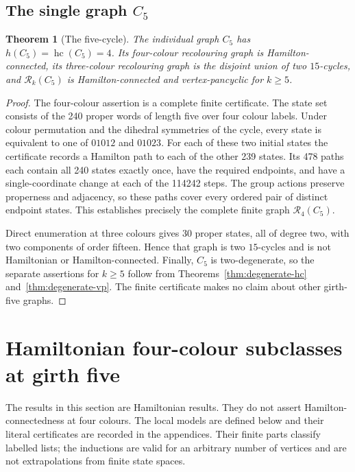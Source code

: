 \documentclass[11pt]{article}
\newtheorem{theorem}{Theorem}[section]
\theoremstyle{remark}
\newcommand{\R}{\mathcal R}
\newcommand{\Rk}{\mathcal R_k}
\newcommand{\hc}{\operatorname{hc}}
\numberwithin{equation}{section}
\numberwithin{table}{section}
\begin{document}
\subsection{The single graph \texorpdfstring{$C_5$}{C5}}

\begin{theorem}[The five-cycle]
\label{thm:c5}
The individual graph $C_5$ has $h(C_5)=\hc(C_5)=4$.
Its four-colour recolouring graph is Hamilton-connected, its
three-colour recolouring graph is the disjoint union of two $15$-cycles,
and $\Rk(C_5)$ is Hamilton-connected and vertex-pancyclic for
$k\ge5$.
\end{theorem}

\begin{proof}
The four-colour assertion is a complete finite certificate.  The state
set consists of the 240 proper words of length five over four colour
labels.  Under colour permutation and the dihedral symmetries of the
cycle, every state is equivalent to one of $01012$ and $01023$.
For each of these two initial states the certificate records a Hamilton
path to each of the other 239 states.  Its 478 paths each contain all
240 states exactly once, have the required endpoints, and have a
single-coordinate change at each of the 114242 steps.  The group
actions preserve properness and adjacency, so these paths cover every
ordered pair of distinct endpoint states.  This establishes precisely
the complete finite graph $\R_4(C_5)$.

Direct enumeration at three colours gives 30 proper states, all of
degree two, with two components of order fifteen.  Hence that graph is
two $15$-cycles and is not Hamiltonian or Hamilton-connected.
Finally, $C_5$ is two-degenerate, so the separate assertions for
$k\ge5$ follow from Theorems~\ref{thm:degenerate-hc}
and~\ref{thm:degenerate-vp}.  The finite certificate makes no claim
about other girth-five graphs.
\end{proof}


\section{Hamiltonian four-colour subclasses at girth five}
\label{sec:four-colour-subclasses}

The results in this section are Hamiltonian results.  They do not assert
Hamilton-connectedness at four colours.  The local models are defined
below and their literal certificates are recorded in the appendices.
Their finite parts classify
labelled lists; the inductions are valid for an arbitrary number of
vertices and are not extrapolations from finite state spaces.
\end{document}
